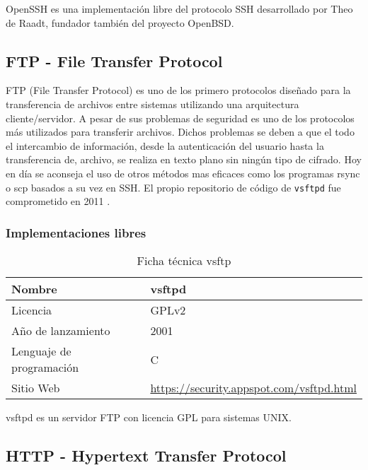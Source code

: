 OpenSSH es una implementación libre del protocolo SSH desarrollado por Theo de Raadt, fundador también del proyecto OpenBSD.

\subsection {FTP - File Transfer Protocol}

FTP (File Transfer Protocol) es uno de los primero protocolos diseñado para la transferencia de archivos entre sistemas utilizando una arquitectura cliente/servidor. A pesar de sus problemas de seguridad \cite{todd_why_2000} es uno de los protocolos más utilizados para transferir archivos. Dichos problemas se deben a que el todo el intercambio de información, desde la autenticación del usuario hasta la transferencia de, archivo, se realiza en texto plano sin ningún tipo de cifrado. Hoy en día se aconseja el uso de otros métodos mas eficaces como los programas rsync o scp basados a su vez en SSH. El propio repositorio de código de \texttt{vsftpd} fue comprometido en 2011 \cite{hkcert_security_bulletin_sa11070501_2011}.

\subsubsection {Implementaciones libres}

\begin{table}[H]
\begin{tabular}{|l|l|}
\hline
Nombre                   & vsftpd                       \\ \hline
Licencia                 & GPLv2                        \\ \hline
Año de lanzamiento       & 2001                         \\ \hline
Lenguaje de programación & C                            \\ \hline
Sitio Web                & \url{https://security.appspot.com/vsftpd.html} \\ \hline
\end{tabular}
\caption{Ficha técnica vsftp}
\end{table}

vsftpd es un servidor FTP con licencia GPL para sistemas UNIX.

\subsection {HTTP - Hypertext Transfer Protocol}

